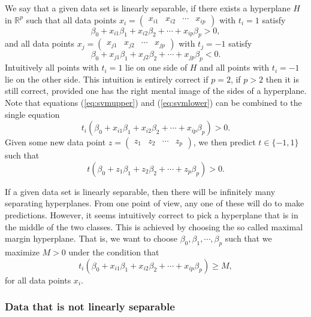 \documentclass[parskip=half]{scrartcl}
\theoremstyle{definition}
\theoremstyle{remark}
\newcommand{\R}{\mathbb{R}}
\begin{document}
We say that a given data set is linearly separable, if there exists a hyperplane $H$ in $\R^p$ such that all data points $x_i = \begin{pmatrix} x_{i1} & x_{i2}  & \cdots & x_{ip} \end{pmatrix}$ with $t_i = 1$ satisfy 
\begin{equation} \label{eq:svmupper}
	\beta_0 + x_{i1} \beta_1 + x_{i2} \beta_2 + \cdots + x_{ip} \beta_p > 0,
\end{equation}
and all data points $x_j = \begin{pmatrix} x_{j1} & x_{j2}  & \cdots & x_{jp} \end{pmatrix}$ with $t_j = -1$ satisfy
\begin{equation} \label{eq:svmlower}
	\beta_0 + x_{j1} \beta_1 + x_{j2} \beta_2 + \cdots + x_{jp} \beta_p < 0.
\end{equation}
Intuitively all points with $t_i = 1$ lie on one side of $H$ and all points with $t_i = -1$ lie on the other side. 
This intuition is entirely correct if $p = 2$, if $p>2$ then it is still correct, provided one has the right mental image of the sides of a hyperplane. 
Note that equations (\ref{eq:svmupper}) and (\ref{eq:svmlower}) can be combined to the single equation
\begin{equation} \label{eq:svmsep}
	t_i(\beta_0 + x_{i1} \beta_1 + x_{i2} \beta_2 + \cdots + x_{ip} \beta_p) > 0.
\end{equation}
Given some new data point $z = \begin{pmatrix} z_1 & z_2  & \cdots & z_p \end{pmatrix}$, we then predict $t \in \{-1,1\}$ such that
\[
	t(\beta_0 + z_1 \beta_1 + z_2 \beta_2 + \cdots + z_p \beta_p) > 0.
\] 

If a given data set is linearly separable, then there will be infinitely many separating hyperplanes. 
From one point of view, any one of these will do to make predictions. 
However, it seems intuitively correct to pick a hyperplane that is in the middle of the two classes. 
This is achieved by choosing the so called maximal margin hyperplane.
That is, we want to choose $\beta_0, \beta_1, \cdots, \beta_p$ such that we maximize $M > 0$ under the condition that 
\[
	t_i(\beta_0 + x_{i1} \beta_1 + x_{i2} \beta_2 + \cdots + x_{ip} \beta_p) \geq M,
\] 
for all data points $x_i$.

\subsubsection{Data that is not linearly separable}
\end{document}
